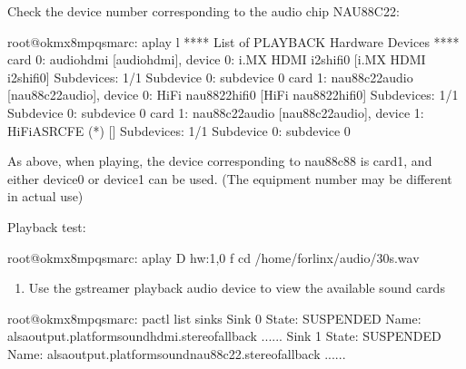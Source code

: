 \documentclass[letterpaper,10pt,openany,english]{sphinxmanual}
\begin{document}
\sphinxAtStartPar
Check the device number corresponding to the audio chip NAU88C22:

\begin{sphinxVerbatim}[commandchars=\\\{\}]
root@ok\PYGZhy{}mx8mpq\PYGZhy{}smarc:\PYGZti{}\PYGZsh{} aplay \PYGZhy{}l
**** List of PLAYBACK Hardware Devices ****
card 0: audiohdmi [audio\PYGZhy{}hdmi], device 0: i.MX HDMI i2s\PYGZhy{}hifi\PYGZhy{}0 [i.MX HDMI i2s\PYGZhy{}hifi\PYGZhy{}0]
  Subdevices: 1/1
  Subdevice \PYGZsh{}0: subdevice \PYGZsh{}0
card 1: nau88c22audio [nau88c22\PYGZhy{}audio], device 0: HiFi nau8822\PYGZhy{}hifi\PYGZhy{}0 [HiFi nau8822\PYGZhy{}hifi\PYGZhy{}0]
Subdevices: 1/1
  Subdevice \PYGZsh{}0: subdevice \PYGZsh{}0
card 1: nau88c22audio [nau88c22\PYGZhy{}audio], device 1: HiFi\PYGZhy{}ASRC\PYGZhy{}FE (*) []
  Subdevices: 1/1
  Subdevice \PYGZsh{}0: subdevice \PYGZsh{}0
\end{sphinxVerbatim}

\sphinxAtStartPar
As above, when playing, the device corresponding to nau88c88 is card1, and either device0 or device1 can be used. (The equipment number may be different in actual use)

\sphinxAtStartPar
Playback test:

\begin{sphinxVerbatim}[commandchars=\\\{\}]
root@ok\PYGZhy{}mx8mpq\PYGZhy{}smarc:\PYGZti{}\PYGZsh{} aplay \PYGZhy{}D hw:1,0 \PYGZhy{}f cd /home/forlinx/audio/30s.wav
\end{sphinxVerbatim}
\begin{enumerate}
%
\setcounter{enumi}{1}
\item {} 
\sphinxAtStartPar
Use the gstreamer playback audio device to view the available sound cards

\end{enumerate}

\begin{sphinxVerbatim}[commandchars=\\\{\}]
root@ok\PYGZhy{}mx8mpq\PYGZhy{}smarc:\PYGZti{}\PYGZsh{} pactl list sinks
Sink \PYGZsh{}0
        State: SUSPENDED
        Name: alsa\PYGZus{}output.platform\PYGZhy{}sound\PYGZhy{}hdmi.stereo\PYGZhy{}fallback
......
Sink \PYGZsh{}1
        State: SUSPENDED
        Name: alsa\PYGZus{}output.platform\PYGZhy{}sound\PYGZhy{}nau88c22.stereo\PYGZhy{}fallback
......
\end{sphinxVerbatim}
\end{document}
